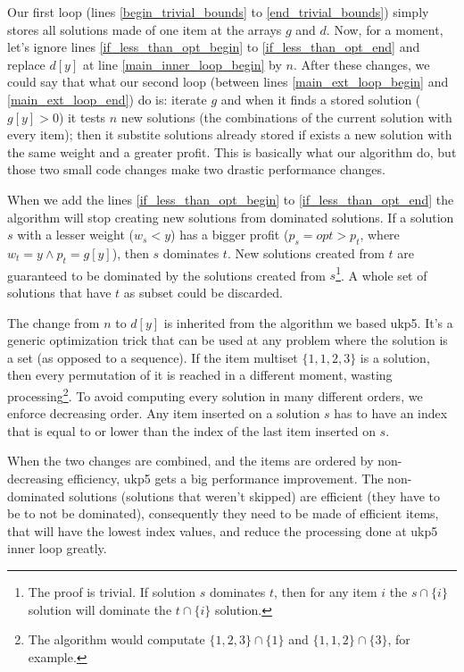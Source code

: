 \documentclass[runningheads,a4paper]{llncs}
\begin{document}
Our first loop (lines \ref{begin_trivial_bounds} to \ref{end_trivial_bounds}) simply stores all solutions made of one item at the arrays \(g\) and \(d\). Now, for a moment, let's ignore lines \ref{if_less_than_opt_begin} to \ref{if_less_than_opt_end} and replace \(d[y]\) at line \ref{main_inner_loop_begin} by \(n\). After these changes, we could say that what our second loop (between lines \ref{main_ext_loop_begin} and \ref{main_ext_loop_end}) do is: iterate \(g\) and when it finds a stored solution (\(g[y] > 0\)) it tests \(n\) new solutions (the combinations of the current solution with every item); then it substite solutions already stored if exists a new solution with the same weight and a greater profit. This is basically what our algorithm do, but those two small code changes make two drastic performance changes.%

When we add the lines \ref{if_less_than_opt_begin} to \ref{if_less_than_opt_end} the algorithm will stop creating new solutions from dominated solutions. If a solution \(s\) with a lesser weight (\(w_s < y\)) has a bigger profit (\(p_s = opt > p_t\), where \(w_t = y \land p_t = g[y]\)), then \(s\) dominates \(t\). New solutions created from \(t\) are guaranteed to be dominated by the solutions created from \(s\)\footnote{The proof is trivial. If solution \(s\) dominates \(t\), then for any item \(i\) the \(s \cap \{i\}\) solution will dominate the \(t \cap \{i\}\) solution.}. A whole set of solutions that have \(t\) as subset could be discarded.

The change from \(n\) to \(d[y]\) is inherited from the algorithm we based ukp5. It's a generic optimization trick that can be used at any problem where the solution is a set (as opposed to a sequence). If the item multiset \(\{1, 1, 2, 3\}\) is a solution, then every permutation of it is reached in a different moment, wasting processing\footnote{The algorithm would computate \(\{1, 2, 3\} \cap \{1\}\) and \(\{1, 1, 2\} \cap \{3\}\), for example.}. To avoid computing every solution in many different orders, we enforce decreasing order. Any item inserted on a solution \(s\) has to have an index that is equal to or lower than the index of the last item inserted on \(s\). 

When the two changes are combined, and the items are ordered by non-decreasing efficiency, ukp5 gets a big performance improvement. The non-dominated solutions (solutions that weren't skipped) are efficient (they have to be to not be dominated), consequently they need to be made of efficient items, that will have the lowest index values, and reduce the processing done at ukp5 inner loop greatly.
\end{document}
